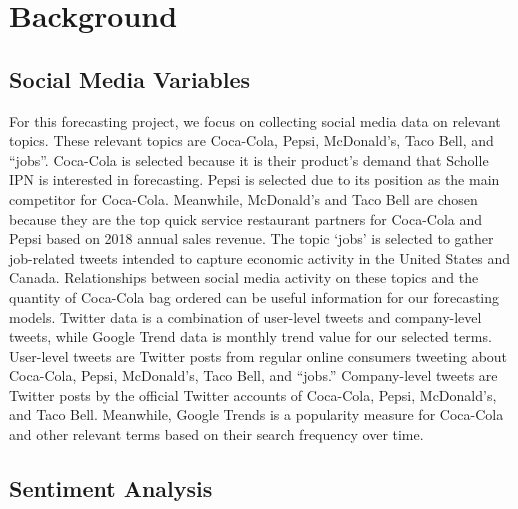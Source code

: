 \documentclass[12pt,oneside]{chicagocapstone}
\begin{document}
\hypertarget{background}{%
\chapter*{Background}\label{background}}

\hypertarget{social-media-variables}{%
\section*{Social Media Variables}\label{social-media-variables}}

For this forecasting project, we focus on collecting social media data on relevant topics. These relevant topics are Coca-Cola, Pepsi, McDonald's, Taco Bell, and ``jobs''. Coca-Cola is selected because it is their product's demand that Scholle IPN is interested in forecasting. Pepsi is selected due to its position as the main competitor for Coca-Cola. Meanwhile, McDonald's and Taco Bell are chosen because they are the top quick service restaurant partners for Coca-Cola and Pepsi based on 2018 annual sales revenue. The topic `jobs' is selected to gather job-related tweets intended to capture economic activity in the United States and Canada. Relationships between social media activity on these topics and the quantity of Coca-Cola bag ordered can be useful information for our forecasting models.
Twitter data is a combination of user-level tweets and company-level tweets, while Google Trend data is monthly trend value for our selected terms. User-level tweets are Twitter posts from regular online consumers tweeting about Coca-Cola, Pepsi, McDonald's, Taco Bell, and ``jobs.'' Company-level tweets are Twitter posts by the official Twitter accounts of Coca-Cola, Pepsi, McDonald's, and Taco Bell. Meanwhile, Google Trends is a popularity measure for Coca-Cola and other relevant terms based on their search frequency over time.

\hypertarget{sentiment-analysis}{%
\section*{Sentiment Analysis}\label{sentiment-analysis}}
\end{document}
